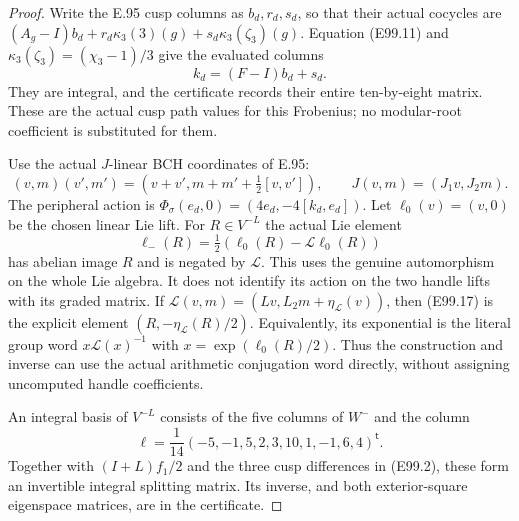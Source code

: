 \begin{proof}
Write the E.95 cusp columns as $b_d,r_d,s_d$, so that
their actual cocycles are
$(A_g-I)b_d+r_d\kappa_3(3)(g)+s_d\kappa_3(\zeta_3)(g)$.
Equation (E99.11) and
$\kappa_3(\zeta_3)=(\chi_3-1)/3$ give the evaluated columns
\[
                    k_d=(F-I)b_d+s_d.
 \tag{E99.15}
\]
They are integral, and the certificate records their
entire ten-by-eight matrix. These are the actual cusp
path values for this Frobenius; no modular-root coefficient
is substituted for them.

Use the actual $J$-linear BCH coordinates of E.95:
\[
 (v,m)(v',m')=(v+v',m+m'+\tfrac12[v,v']),\qquad
 J(v,m)=(J_1v,J_2m).
 \tag{E99.16}
\]
The peripheral action is
$\Phi_\sigma(e_d,0)=(4e_d,-4[k_d,e_d])$.
Let $\ell_0(v)=(v,0)$ be the chosen linear Lie lift.
For $R\in V^{-L}$ the actual Lie element
\[
       \ell_-(R)=\tfrac12(\ell_0(R)-\mathcal L\ell_0(R))
 \tag{E99.17}
\]
has abelian image $R$ and is negated by $\mathcal L$.
This uses the genuine automorphism on the whole Lie
algebra. It does not identify its action on the two
handle lifts with its graded matrix. If
$\mathcal L(v,m)=(Lv,L_2m+\eta_{\mathcal L}(v))$,
then (E99.17) is the explicit element
$(R,-\eta_{\mathcal L}(R)/2)$.
Equivalently, its exponential is the literal group word
$x\mathcal L(x)^{-1}$ with $x=\exp(\ell_0(R)/2)$.
Thus the construction and inverse can use the actual
arithmetic conjugation word directly, without assigning
uncomputed handle coefficients.

An integral basis of $V^{-L}$ consists of the five
columns of $W^-$ and the column
\[
 \ell=\frac1{14}(-5,-1,5,2,3,10,1,-1,6,4)^{\mathsf t}.
 \tag{E99.18}
\]
Together with $(I+L)f_1/2$ and the three cusp differences
in (E99.2), these form an invertible integral splitting
matrix. Its inverse, and both exterior-square eigenspace
matrices, are in the certificate.


\end{proof}

